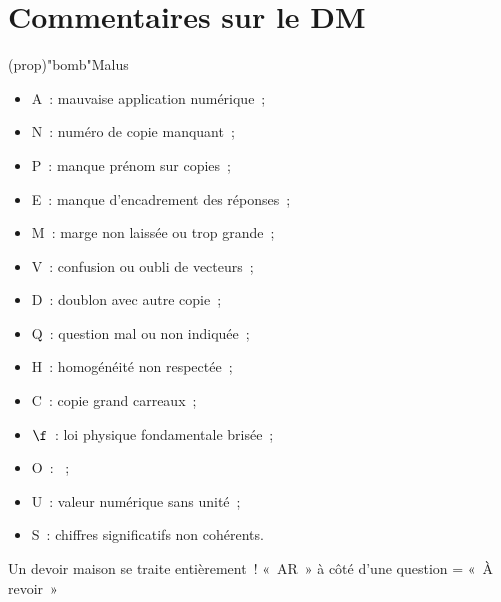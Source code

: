 \documentclass[a4paper, 11pt, final, garamond]{book}
\begin{document}
\setcounter{chapter}{-1}

\chapter{Commentaires sur le DM}

\begin{tcn}(prop)"bomb"{Malus}
	\begin{minipage}{0.50\linewidth}
		\begin{itemize}
			\item A~: mauvaise application numérique~;
			\item N~: numéro de copie manquant~;
			\item P~: manque prénom sur copies~;
			\item E~: manque d'encadrement des réponses~;
			\item M~: marge non laissée ou trop grande~;
			\item V~: confusion ou oubli de vecteurs~;
			\item D~: doublon avec autre copie~;
		\end{itemize}
	\end{minipage}
	\begin{minipage}{0.50\linewidth}
		\begin{itemize}
			\item Q~: question mal ou non indiquée~;
			\item H~: homogénéité non respectée~;
			\item C~: copie grand carreaux~;
			\item $\f$~: loi physique fondamentale brisée~;
			\item O~: ~;
			\item U~: valeur numérique sans unité~;
			\item S~: chiffres significatifs non cohérents.
		\end{itemize}
	\end{minipage}
\end{tcn}

\begin{center}
	\Huge Un devoir maison se traite entièrement~!
	\smallbreak
	«~AR~» à côté d'une question = «~À revoir~»
\end{center}
\end{document}
